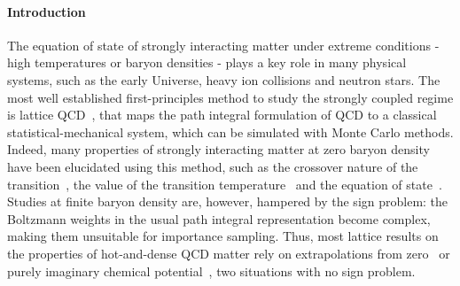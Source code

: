 \documentclass[twocolumn,showpacs,preprintnumbers,amsmath,amssymb,latexsym,prl,footinbib,floatfix,superscriptaddress]{revtex4-2}
\begin{document}
\maketitle

\paragraph{Introduction}

The equation of state of strongly interacting matter under extreme conditions - high 
temperatures or baryon densities - plays a key role in many physical systems, 
such as the early Universe, heavy ion collisions and neutron stars. 
The most well established first-principles method to study 
the strongly coupled regime is lattice QCD~\cite{Montvay:1994cy}, that maps 
the path integral formulation of QCD to a classical statistical-mechanical 
system, which
can be simulated with Monte Carlo methods.
Indeed, many properties of strongly interacting 
matter at zero baryon density have been elucidated using this method, such as the 
crossover nature of the transition~\cite{Aoki:2006we}, the value of the transition 
temperature~\cite{Borsanyi:2010bp,Bazavov:2011nk} 
and the equation of state~\cite{Borsanyi:2010cj,Bazavov:2014pvz}.
Studies  
at finite baryon 
density are, however, hampered by the sign problem: the 
Boltzmann weights in the usual path integral 
representation become complex, 
making them unsuitable for importance sampling. Thus, most lattice 
results on the properties of hot-and-dense QCD matter rely on extrapolations from zero~\cite{Gavai:2003mf,Allton:2005gk,
  MILC:2008reg,Borsanyi:2011sw,Borsanyi:2012cr,
  Bellwied:2015lba,Ding:2015fca,Bazavov:2017dus,HotQCD:2018pds,
  Giordano:2019slo,Bazavov:2020bjn} 
or purely imaginary chemical potential~\cite{deForcrand:2002hgr,DElia:2002tig,DElia:2009pdy,
  Cea:2014xva,Bonati:2014kpa,Cea:2015cya,Bonati:2015bha,
  Bellwied:2015rza,DElia:2016jqh,Gunther:2016vcp,Alba:2017mqu,
  Vovchenko:2017xad,Bonati:2018nut,Borsanyi:2018grb,Bellwied:2019pxh,
  Borsanyi:2020fev}, two situations with no sign problem.
\end{document}
